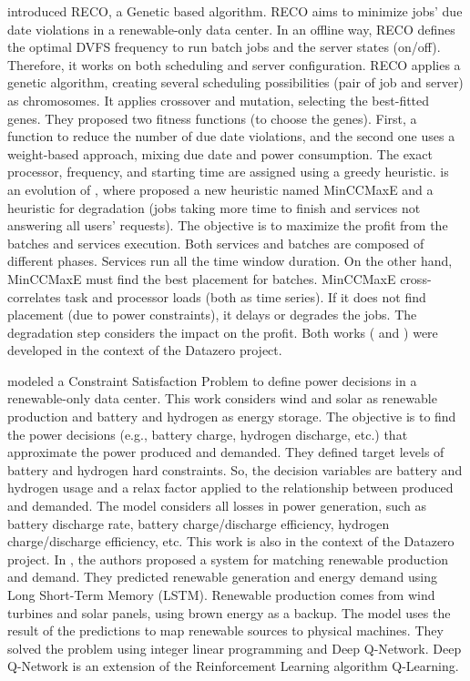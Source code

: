 \citeauthor{caux2018optimization} \cite{caux2018optimization} introduced RECO, a Genetic based algorithm. RECO aims to minimize jobs' due date violations in a renewable-only data center. In an offline way, RECO defines the optimal DVFS frequency to run batch jobs and the server states (on/off). Therefore, it works on both scheduling and server configuration. RECO applies a genetic algorithm, creating several scheduling possibilities (pair of job and server) as chromosomes. It applies crossover and mutation, selecting the best-fitted genes. They proposed two fitness functions (to choose the genes). First, a function to reduce the number of due date violations, and the second one uses a weight-based approach, mixing due date and power consumption. The exact processor, frequency, and starting time are assigned using a greedy heuristic. \cite{caux2019phase} is an evolution of \cite{caux2018optimization}, where \citeauthor{caux2019phase} proposed a new heuristic named MinCCMaxE and a heuristic for degradation (jobs taking more time to finish and services not answering all users' requests). The objective is to maximize the profit from the batches and services execution. Both services and batches are composed of different phases. Services run all the time window duration. On the other hand, MinCCMaxE must find the best placement for batches. MinCCMaxE cross-correlates task and processor loads (both as time series). If it does not find placement (due to power constraints), it delays or degrades the jobs. The degradation step considers the impact on the profit. Both works (\cite{caux2018optimization} and \cite{caux2019phase}) were developed in the context of the Datazero project.

\citeauthor{haddad2019mixed} \cite{haddad2019mixed} modeled a Constraint Satisfaction Problem to define power decisions in a renewable-only data center. This work considers wind and solar as renewable production and battery and hydrogen as energy storage. The objective is to find the power decisions (e.g., battery charge, hydrogen discharge, etc.) that approximate the power produced and demanded. They defined target levels of battery and hydrogen hard constraints. So, the decision variables are battery and hydrogen usage and a relax factor applied to the relationship between produced and demanded. The model considers all losses in power generation, such as battery discharge rate, battery charge/discharge efficiency, hydrogen charge/discharge efficiency, etc. This work is also in the context of the Datazero project. In \cite{gao2020smartly}, the authors proposed a system for matching renewable production and demand. They predicted renewable generation and energy demand using Long Short-Term Memory (LSTM). Renewable production comes from wind turbines and solar panels, using brown energy as a backup. The model uses the result of the predictions to map renewable sources to physical machines. They solved the problem using integer linear programming and Deep Q-Network. Deep Q-Network is an extension of the Reinforcement Learning algorithm Q-Learning. 

